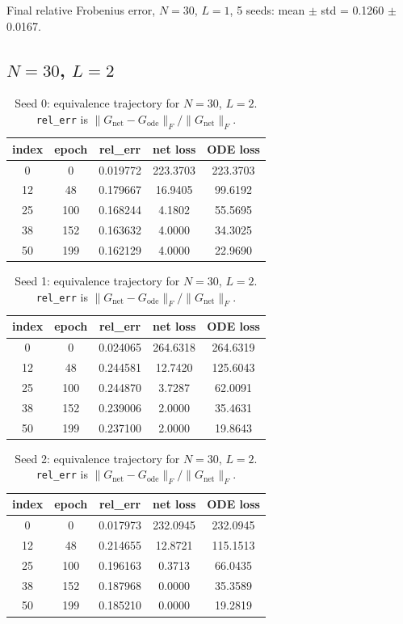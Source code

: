 Final relative Frobenius error, $N=30$, $L=1$, 5 seeds: mean $\pm$ std = 0.1260 $\pm$ 0.0167.

\subsection{$N=30$, $L=2$}
\begin{table}[H]
\centering
\caption{Seed 0: equivalence trajectory for $N=30$, $L=2$. \texttt{rel\_err} is $\|G_{\mathrm{net}} - G_{\mathrm{ode}}\|_F / \|G_{\mathrm{net}}\|_F$.}
\label{tab:equiv-N30-L2-s0}
\begin{tabular}{c c c c c}
\toprule
index & epoch & rel\_err & net loss & ODE loss \\
\midrule
0 & 0 & 0.019772 & 223.3703 & 223.3703 \\
12 & 48 & 0.179667 & 16.9405 & 99.6192 \\
25 & 100 & 0.168244 & 4.1802 & 55.5695 \\
38 & 152 & 0.163632 & 4.0000 & 34.3025 \\
50 & 199 & 0.162129 & 4.0000 & 22.9690 \\
\bottomrule
\end{tabular}
\end{table}

\begin{table}[H]
\centering
\caption{Seed 1: equivalence trajectory for $N=30$, $L=2$. \texttt{rel\_err} is $\|G_{\mathrm{net}} - G_{\mathrm{ode}}\|_F / \|G_{\mathrm{net}}\|_F$.}
\label{tab:equiv-N30-L2-s1}
\begin{tabular}{c c c c c}
\toprule
index & epoch & rel\_err & net loss & ODE loss \\
\midrule
0 & 0 & 0.024065 & 264.6318 & 264.6319 \\
12 & 48 & 0.244581 & 12.7420 & 125.6043 \\
25 & 100 & 0.244870 & 3.7287 & 62.0091 \\
38 & 152 & 0.239006 & 2.0000 & 35.4631 \\
50 & 199 & 0.237100 & 2.0000 & 19.8643 \\
\bottomrule
\end{tabular}
\end{table}

\begin{table}[H]
\centering
\caption{Seed 2: equivalence trajectory for $N=30$, $L=2$. \texttt{rel\_err} is $\|G_{\mathrm{net}} - G_{\mathrm{ode}}\|_F / \|G_{\mathrm{net}}\|_F$.}
\label{tab:equiv-N30-L2-s2}
\begin{tabular}{c c c c c}
\toprule
index & epoch & rel\_err & net loss & ODE loss \\
\midrule
0 & 0 & 0.017973 & 232.0945 & 232.0945 \\
12 & 48 & 0.214655 & 12.8721 & 115.1513 \\
25 & 100 & 0.196163 & 0.3713 & 66.0435 \\
38 & 152 & 0.187968 & 0.0000 & 35.3589 \\
50 & 199 & 0.185210 & 0.0000 & 19.2819 \\
\bottomrule
\end{tabular}
\end{table}

